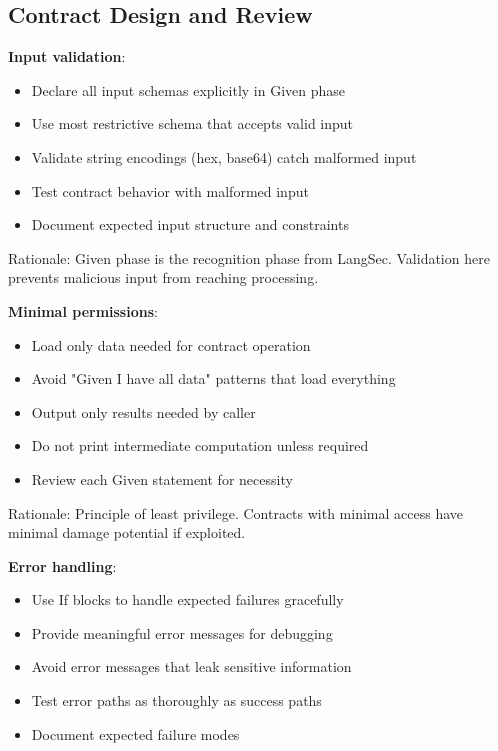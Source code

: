 \subsection{Contract Design and Review}

\textbf{Input validation}:

\begin{itemize}
\item Declare all input schemas explicitly in Given phase
\item Use most restrictive schema that accepts valid input
\item Validate string encodings (hex, base64) catch malformed input
\item Test contract behavior with malformed input
\item Document expected input structure and constraints
\end{itemize}

Rationale: Given phase is the recognition phase from
LangSec. Validation here prevents malicious input from reaching
processing.

\textbf{Minimal permissions}:

\begin{itemize}
\item Load only data needed for contract operation
\item Avoid "Given I have all data" patterns that load everything
\item Output only results needed by caller
\item Do not print intermediate computation unless required
\item Review each Given statement for necessity
\end{itemize}

Rationale: Principle of least privilege. Contracts with minimal access
have minimal damage potential if exploited.

\textbf{Error handling}:

\begin{itemize}
\item Use If blocks to handle expected failures gracefully
\item Provide meaningful error messages for debugging
\item Avoid error messages that leak sensitive information
\item Test error paths as thoroughly as success paths
\item Document expected failure modes
\end{itemize}

